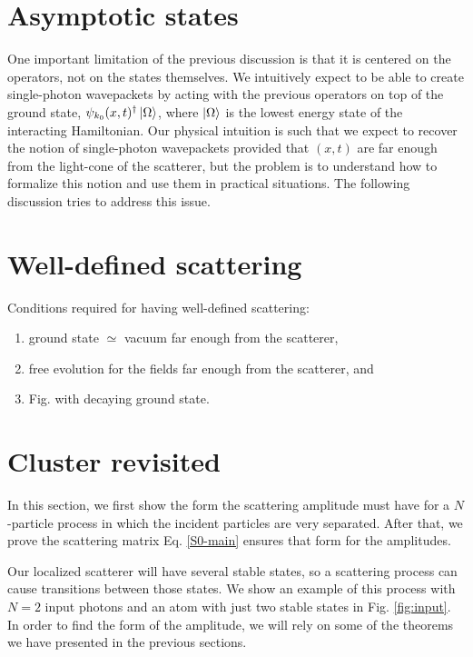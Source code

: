 \documentclass[notitlepage, prx, preprint, amsmath,superscriptaddress,amssymb]{revtex4-1}
\begin{document}
\section{Asymptotic states}

One important limitation of the previous discussion is that it is centered on the operators, not on the states themselves. We intuitively expect to be able to create single-photon wavepackets by acting with the previous operators on top of the ground state, $\psi_{k_0}(x,t)^\dagger\ket{\Omega}$, where $\ket{\Omega}$ is the lowest energy state of the interacting Hamiltonian. Our physical intuition is such that we expect to recover the notion of single-photon wavepackets provided that $(x,t)$ are far enough from the light-cone of the scatterer, but the problem is to understand how to formalize this notion and use them in practical situations. The following discussion tries to address this issue.


\section{Well-defined scattering}

{\color{blue}Conditions required for having well-defined scattering:

\begin{enumerate}
\item ground state $\simeq$ vacuum far enough from the scatterer,
\item free evolution for the fields far enough from the scatterer, and
\item Fig. with decaying ground state.
\end{enumerate}
}

\section{Cluster revisited}

In this section, we first show the form the scattering amplitude must have for a $N$-particle process in which the incident particles are very separated. After that, we prove the scattering matrix Eq. \eqref{S0-main} ensures that form for the amplitudes.

Our localized scatterer will have several stable states, so a scattering process can cause transitions between those states. We show an example of this process with $N=2$ input photons and an atom with just two stable states in Fig. \ref{fig:input}. In order to find the form of the amplitude, we will rely on some of the theorems we have presented in the previous sections.
\end{document}
